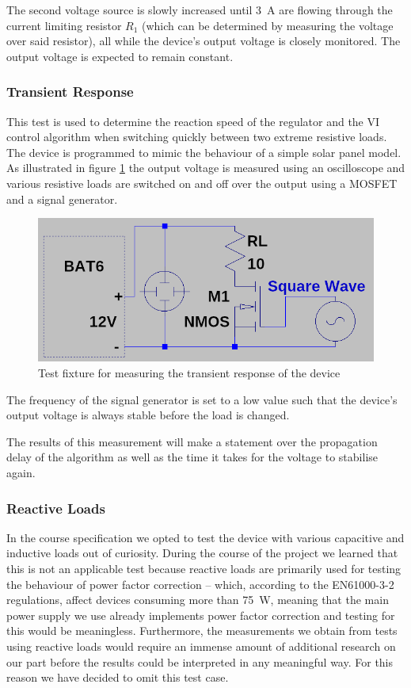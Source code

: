 The second voltage source is slowly increased until \SI{3}{\ampere} are  flowing
through  the  current  limiting  resistor  $R_1$  (which  can  be determined  by
measuring the voltage over said resistor), all while the device's output voltage
is closely monitored. The output voltage is expected to remain constant.


\subsubsection{Transient Response}

This test is used  to  determine  the reaction speed of the regulator and the VI
control algorithm when switching  quickly  between  two extreme resistive loads.
The device is programmed to mimic  the  behaviour of a simple solar panel model.
As illustrated in figure \ref{fig:verification:transient_fix} the output voltage
is  measured  using  an oscilloscope and various resistive loads are switched on
and off over the output using a MOSFET and a signal generator.

\begin{figure}[th!]
    \centering
    \includegraphics[width=.6\textwidth]{images/sim/transient-fixture.png}
    \caption{Test fixture for measuring the transient response of the device}
    \label{fig:verification:transient_fix}
\end{figure}

The frequency of the signal generator is set  to  a  low  value  such  that  the
device's output voltage is always stable before the load is changed.

The results of this measurement will make a statement over the propagation delay
of  the  algorithm as well as the time it takes for  the  voltage  to  stabilise
again.


\subsubsection{Reactive Loads}

In the course specification we  opted to test the device with various capacitive
and  inductive  loads  out  of  curiosity. During the course of the  project  we
learned that this is not an applicable test because reactive loads are primarily
used for testing the behaviour of power factor correction -- which, according to
the EN61000-3-2  regulations\cite{ref:pfc},  affect  devices consuming more than
\SI{75}{\watt},  meaning  that  the main power supply we use already implements
power factor correction and testing for this would  be meaningless. Furthermore,
the measurements we obtain  from  tests  using  reactive  loads would require an
immense  amount of additional research on our part before the results  could  be
interpreted in any  meaningful way. For this reason we have decided to omit this
test case.


